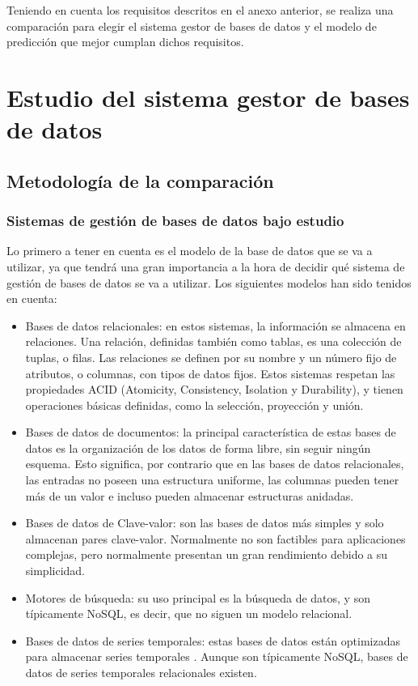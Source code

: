 

Teniendo en cuenta los requisitos descritos en el anexo anterior, se realiza una comparación para elegir el sistema 
gestor de bases de datos y el modelo de predicción que mejor cumplan dichos requisitos.

\section{Estudio del sistema gestor de bases de datos}

\subsection{Metodología de la comparación}

\subsubsection{Sistemas de gestión de bases de datos bajo estudio}

Lo primero a tener en cuenta es el modelo de la base de datos que se va a utilizar, ya que tendrá una gran importancia
a la hora de decidir qué sistema de gestión de bases de datos se va a utilizar. Los siguientes modelos \cite{10.5555/3364297} han sido
tenidos en cuenta:

\begin{itemize}
    \item Bases de datos relacionales: en estos sistemas, la información se almacena en relaciones. Una relación,
        definidas también como tablas, es una colección de tuplas, o filas. Las relaciones se definen por su nombre
        y un número fijo de atributos, o columnas, con tipos de datos fijos. Estos sistemas respetan las propiedades
        ACID (Atomicity, Consistency, Isolation y Durability), y tienen operaciones básicas definidas, como la selección,
        proyección y unión.
    \item Bases de datos de documentos: la principal característica de estas bases de datos es la organización de los datos
        de forma libre, sin seguir ningún esquema. Esto significa, por contrario que en las bases de datos relacionales,
        las entradas no poseen una estructura uniforme, las columnas pueden tener más de un valor e incluso pueden almacenar
        estructuras anidadas.
    \item Bases de datos de Clave-valor: son las bases de datos más simples y solo almacenan pares clave-valor. Normalmente
        no son factibles para aplicaciones complejas, pero normalmente presentan un gran rendimiento debido a su
        simplicidad.
    \item Motores de búsqueda: su uso principal es la búsqueda de datos, y son típicamente NoSQL, es decir, que no siguen
        un modelo relacional.
    \item Bases de datos de series temporales: estas bases de datos están optimizadas para almacenar series temporales \cite{influx:timeseries}.
        Aunque son típicamente NoSQL, bases de datos de series temporales relacionales existen.
\end{itemize}

